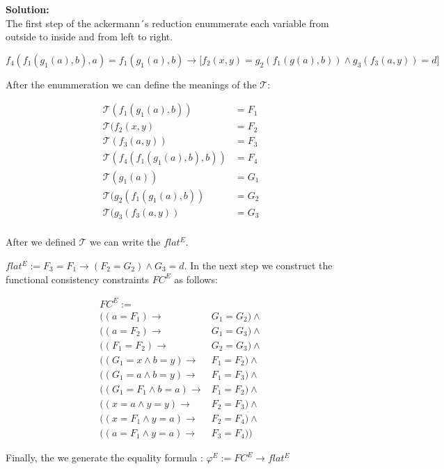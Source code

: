 \documentclass[11pt,a4paper]{uebung}
\newcommand{\solution}[1]{\par {\bf Solution:}\\#1}
\def\cT{\mathcal{T}}
\begin{document}
\solution{
  The first step of the ackermann´s reduction enummerate each variable from outside to inside and from left to right. 
 
 \begin{displaymath}
  f_4\left(f_1\left(g_1\left(a\right),b\right),a\right) = f_1(g_1(a),b) \rightarrow \big[ f_2(x,y) = g_2(f_1(g(a),b)) \land
   g_3(f_3(a,y))=d \big]
 \end{displaymath}

After the enummeration we can define the meanings of the $\cT$:

  \begin{align*}
   \cT (f_1(g_1(a),b)) &= F_1  \\
   \cT (f_2(x,y) &= F_2\\
    \cT (f_3(a,y)) &= F_3 \\
    \cT (f_4(f_1(g_1(a),b),b)) &= F_4 \\
    \cT (g_1(a)) &= G_1\\
    \cT (g_2(f_1(g_1(a),b)) &= G_2 \\
    \cT (g_3(f_3(a,y)) &= G_3  \\ 
  \end{align*}

After we defined $\cT$ we can write the $flat^E$.

$ flat^E:= F_3 = F_1 \rightarrow  (F_2 = G_2) \land G_3 = d $. 
In the next step we construct the functional consistency constraints $FC^E$ as follows:
 
 \begin{align*}
  FC^E := \\
    ((a = F_1) \rightarrow & G_1 = G_2) \land \\
     ((a = F_2) \rightarrow & G_1 = G_3) \land \\
      ((F_1 = F_2) \rightarrow & G_2 = G_3) \land \\
      ((G_1 = x \land b=y) \rightarrow & F_1 = F_2) \land \\
      ((G_1 = a \land b=y ) \rightarrow & F_1 = F_3) \land \\
      ((G_1 = F_1 \land b=a) \rightarrow & F_1 = F_2) \land \\
      ((x = a \land y=y) \rightarrow & F_2 = F_3) \land \\
      ((x= F_1 \land y=a) \rightarrow & F_2 = F_4) \land \\
      ((a = F_1 \land y=a) \rightarrow & F_3 = F_4))
 \end{align*}


Finally, the we generate the equality formula : $\varphi^E := FC^E \rightarrow flat^E$

}
\end{document}
